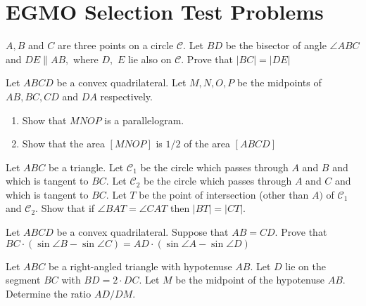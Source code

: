 \documentclass{pset}
\begin{document}
\section*{EGMO Selection Test Problems}

\begin{problems}

\begin{problem}
    \(A, B\) and \(C\) are three points on a circle \(\mathcal{C} .\) Let \(B D\) be the bisector of angle \(\angle A B C\) and \(D E \| A B,\) where \(D,\)
    \(E\) lie also on \(\mathcal{C} .\) Prove that \(|B C|=|D E|\)
\end{problem}

\begin{problem}
    Let \(A B C D\) be a convex quadrilateral. Let \(M, N, O, P\) be the midpoints of \(A B, B C, C D\) and \(D A\) respectively.
    \begin{enumerate}
        \item Show that \(M N O P\) is a parallelogram.
        \item Show that the area \([M N O P]\) is \(1 / 2\) of the area \([A B C D]\)
    \end{enumerate}
\end{problem}

\begin{problem}
    Let \(A B C\) be a triangle. Let \(\mathcal{C}_{1}\) be the circle which passes through \(A\) and \(B\) and which is tangent to \(B C\). Let \(\mathcal{C}_{2}\) be the circle which passes through \(A\) and \(C\) and which is tangent to \(B C .\) Let \(T\) be the point of intersection (other than \(A)\) of \(\mathcal{C}_{1}\) and \(\mathcal{C}_{2} .\) Show that if \(\angle B A T=\angle C A T\) then \(|B T|=|C T| .\)
\end{problem}
    
\begin{problem}
    Let \(A B C D\) be a convex quadrilateral. Suppose that \(A B=C D .\) Prove that
    $
    B C \cdot(\sin \angle B-\sin \angle C)=A D \cdot(\sin \angle A-\sin \angle D)
    $
\end{problem}

\begin{problem}
    Let \(A B C\) be a right-angled triangle with hypotenuse \(A B .\) Let \(D\) lie on the segment \(B C\) with \(B D=2 \cdot D C\). Let \(M\) be the midpoint of the hypotenuse \(A B .\) Determine the ratio \(A D / D M .\)
\end{problem}


\end{problems}
\end{document}
